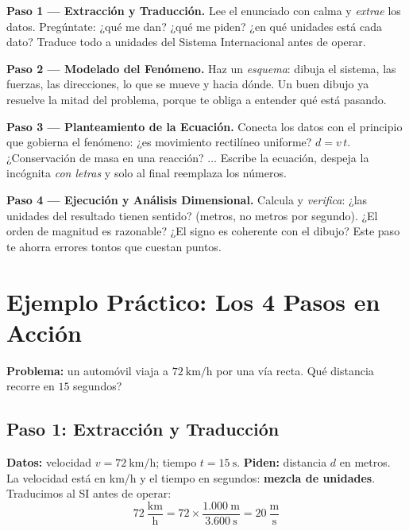 \documentclass[12pt, letterpaper]{article}
\begin{document}
\begin{cuadropasos}
  \textbf{Paso 1 — Extracción y Traducción.} Lee el enunciado con calma y \emph{extrae} los datos. Pregúntate: ¿qué me dan? ¿qué me piden? ¿en qué unidades está cada dato? Traduce todo a unidades del Sistema Internacional antes de operar.
\end{cuadropasos}

\begin{cuadropasos}
  \textbf{Paso 2 — Modelado del Fenómeno.} Haz un \emph{esquema}: dibuja el sistema, las fuerzas, las direcciones, lo que se mueve y hacia dónde. Un buen dibujo ya resuelve la mitad del problema, porque te obliga a entender qué está pasando.
\end{cuadropasos}

\begin{cuadropasos}
  \textbf{Paso 3 — Planteamiento de la Ecuación.} Conecta los datos con el principio que gobierna el fenómeno: ¿es movimiento rectilíneo uniforme? $d = v\,t$. ¿Conservación de masa en una reacción? $\ldots$ Escribe la ecuación, despeja la incógnita \emph{con letras} y solo al final reemplaza los números.
\end{cuadropasos}

\begin{cuadropasos}
  \textbf{Paso 4 — Ejecución y Análisis Dimensional.} Calcula y \emph{verifica}: ¿las unidades del resultado tienen sentido? (metros, no metros por segundo). ¿El orden de magnitud es razonable? ¿El signo es coherente con el dibujo? Este paso te ahorra errores tontos que cuestan puntos.
\end{cuadropasos}

\section{Ejemplo Práctico: Los 4 Pasos en Acción}

\noindent\textbf{Problema:} un automóvil viaja a $72\ \text{km/h}$ por una vía recta. \textquestiondown Qué distancia recorre en $15$ segundos?

\subsection{Paso 1: Extracción y Traducción}

\begin{cuadroinfo}
  \small
  \textbf{Datos:} velocidad $v = 72\ \text{km/h}$; tiempo $t = 15\ \text{s}$. \quad
  \textbf{Piden:} distancia $d$ en metros.
  \\[2pt]
  La velocidad está en km/h y el tiempo en segundos: \textbf{mezcla de unidades}. Traducimos al SI antes de operar:
  \[
    72\ \frac{\text{km}}{\text{h}} = 72 \times \frac{1.000\ \text{m}}{3.600\ \text{s}} = 20\ \frac{\text{m}}{\text{s}}
  \]
\end{cuadroinfo}
\end{document}
